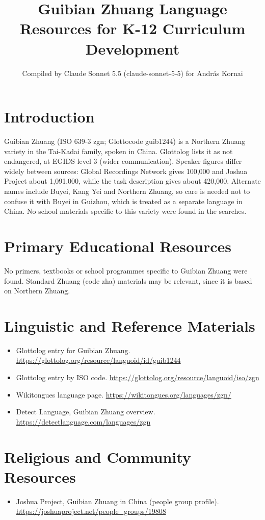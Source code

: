 \documentclass[12pt]{article}
\title{Guibian Zhuang Language Resources for K-12 Curriculum Development}
\author{Compiled by Claude Sonnet 5.5 (claude-sonnet-5-5) for Andr\'as Kornai}
\date{}
\begin{document}
\maketitle

\section{Introduction}
Guibian Zhuang (ISO 639-3 zgn; Glottocode guib1244) is a Northern Zhuang variety in the Tai-Kadai family, spoken in China. Glottolog lists it as not endangered, at EGIDS level 3 (wider communication). Speaker figures differ widely between sources: Global Recordings Network gives 100,000 and Joshua Project about 1,091,000, while the task description gives about 420,000. Alternate names include Buyei, Kang Yei and Northern Zhuang, so care is needed not to confuse it with Buyei in Guizhou, which is treated as a separate language in China. No school materials specific to this variety were found in the searches.

\section{Primary Educational Resources}
No primers, textbooks or school programmes specific to Guibian Zhuang were found. Standard Zhuang (code zha) materials may be relevant, since it is based on Northern Zhuang.

\section{Linguistic and Reference Materials}
\begin{itemize}
\item Glottolog entry for Guibian Zhuang. \url{https://glottolog.org/resource/languoid/id/guib1244}
\item Glottolog entry by ISO code. \url{https://glottolog.org/resource/languoid/iso/zgn}
\item Wikitongues language page. \url{https://wikitongues.org/languages/zgn/}
\item Detect Language, Guibian Zhuang overview. \url{https://detectlanguage.com/languages/zgn}
\end{itemize}

\section{Religious and Community Resources}
\begin{itemize}
\item Joshua Project, Guibian Zhuang in China (people group profile). \url{https://joshuaproject.net/people_groups/19808}
\end{itemize}
\end{document}
